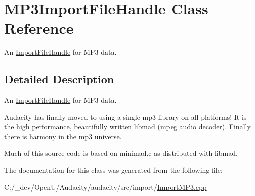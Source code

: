 \hypertarget{class_m_p3_import_file_handle}{}\section{M\+P3\+Import\+File\+Handle Class Reference}
\label{class_m_p3_import_file_handle}


An \hyperlink{class_import_file_handle}{Import\+File\+Handle} for M\+P3 data.  




\subsection{Detailed Description}
An \hyperlink{class_import_file_handle}{Import\+File\+Handle} for M\+P3 data. 

Audacity has finally moved to using a single mp3 library on all platforms! It is the high performance, beautifully written libmad (mpeg audio decoder). Finally there is harmony in the mp3 universe.

Much of this source code is based on \textquotesingle{}minimad.\+c\textquotesingle{} as distributed with libmad. 

The documentation for this class was generated from the following file\+:\begin{DoxyCompactItemize}
\item 
C\+:/\+\_\+dev/\+Open\+U/\+Audacity/audacity/src/import/\hyperlink{_import_m_p3_8cpp}{Import\+M\+P3.\+cpp}\end{DoxyCompactItemize}
